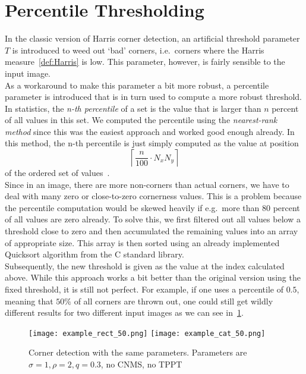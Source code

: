 \section{Percentile Thresholding}\label{sec:Percentile}
In the classic version of Harris corner detection, an artificial threshold parameter $T$
is introduced to weed out `bad' corners, i.e.\ corners where the \linebreak 
Harris measure~\eqref{def:Harris} is low. 
This parameter, however, is fairly sensible to the input image.\\
As a workaround to make this parameter a bit more robust, a percentile
parameter is introduced that is in turn used to compute a more robust threshold.\\
In statistics, the \textit{n-th percentile} of a set is the value that is larger than $n$ percent
of all values in this set.
We computed the percentile using the \textit{nearest-rank method} since this was the easiest
approach and worked good enough already. In this method, the n-th percentile is just simply
computed as the value at position 
\begin{equation} 
    \left\lceil \frac{n}{100}\cdot N_{x}N_{y}\right\rceil 
\end{equation} 
of the ordered set of values~\cite{percentile}.\\
Since in an image, there are more non-corners than actual corners, we have to deal with many zero
or close-to-zero cornerness values. This is a problem because the percentile computation would be skewed
heavily if e.g.\ more than 80 percent of all values are zero already. To solve this, we first filtered
out all values below a threshold close to zero and then accumulated the remaining values into an
array of appropriate size. This array is then sorted using an already implemented Quicksort
algorithm from the C standard library.\\
Subsequently, the new threshold is given as the value at the index calculated above.
While this approach works a bit better than the original version using the fixed threshold, it is
still not perfect. For example, if one uses a percentile of $0.5$, meaning that 
$50\%$ of all corners are thrown out, one could still get wildly different results 
for two different input images as we can see in~\ref{fig:PercExample}.
\begin{figure}[h!]
    \centering
    \texttt{[image: example\_rect\_50.png]}
    \texttt{[image: example\_cat\_50.png]}
    \caption{Corner detection with the same parameters. Parameters are $\sigma=1,\rho=2,q=0.3$, no
    CNMS, no TPPT}\label{fig:PercExample}
\end{figure}\\
